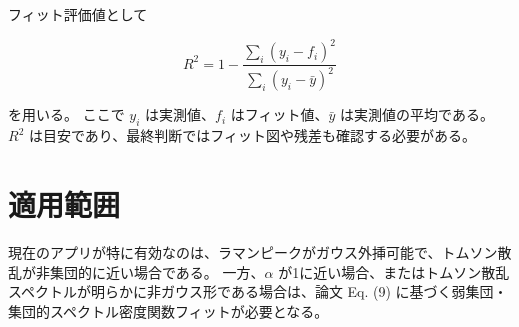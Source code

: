 \documentclass[uplatex,dvipdfmx,11pt]{jsarticle}
\begin{document}
フィット評価値として

\begin{equation}
R^2
=
1
-
\frac{
\sum_i (y_i - f_i)^2
}{
\sum_i (y_i - \bar{y})^2
}
\end{equation}

を用いる。
ここで $y_i$ は実測値、$f_i$ はフィット値、$\bar{y}$ は実測値の平均である。
$R^2$ は目安であり、最終判断ではフィット図や残差も確認する必要がある。

\section{適用範囲}

現在のアプリが特に有効なのは、ラマンピークがガウス外挿可能で、トムソン散乱が非集団的に近い場合である。
一方、$\alpha$ が1に近い場合、またはトムソン散乱スペクトルが明らかに非ガウス形である場合は、論文 Eq. (9) に基づく弱集団・集団的スペクトル密度関数フィットが必要となる。
\end{document}
